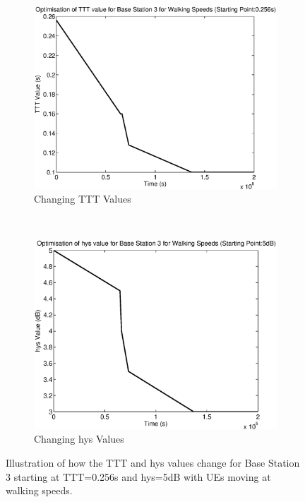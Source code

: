\begin{figure}[H]
        \centering
        \begin{subfigure}[b]{0.49\textwidth}
                \includegraphics[width=\textwidth]{figures/graphs/walkmid/TTT3.eps}
                \caption{Changing TTT Values}
        \end{subfigure}%
        ~ %
        \begin{subfigure}[b]{0.49\textwidth}
                \includegraphics[width=\textwidth]{figures/graphs/walkmid/hys3.eps}
                \caption{Changing hys Values}
        \end{subfigure}
        \caption{Illustration of how the TTT and hys values change for Base Station 3 starting at TTT=0.256s and hys=5dB with UEs moving at walking speeds.}
\end{figure}
